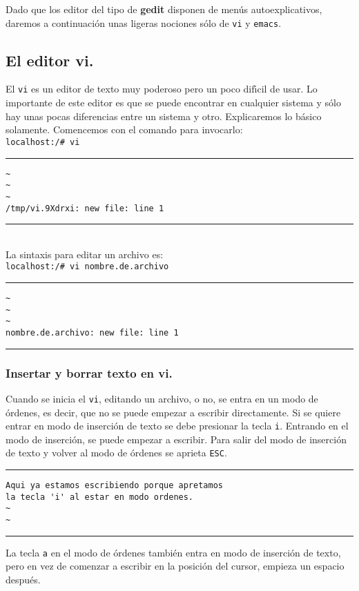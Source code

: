 Dado que los editor del tipo de {\bf gedit} disponen de men{\'u}s
autoexplicativos, daremos a continuaci{\'o}n unas ligeras nociones s{\'o}lo de
\verb+vi+ y \verb+emacs+.

\subsection{El editor vi.}


El \verb+vi+ es un editor de texto muy poderoso pero un poco dif{\'\i}cil
de usar. Lo importante de este editor es que se puede encontrar en
cualquier sistema {\unix} y s{\'o}lo hay unas pocas diferencias entre un
sistema y otro. Explicaremos lo b{\'a}sico solamente. Comencemos con el
comando para invocarlo:\\
\verb+localhost:/# vi+\\
\rule{12.4cm}{0.1mm}
\begin{verbatim}
~
~
~
/tmp/vi.9Xdrxi: new file: line 1 
\end{verbatim}
\rule{12.4cm}{0.1mm}\\
La sintaxis para editar un archivo es:\\ 
\verb+localhost:/# vi nombre.de.archivo+\\
\rule{12.4cm}{0.1mm}
\begin{verbatim}
~
~
~
nombre.de.archivo: new file: line 1
\end{verbatim}
\rule{12.4cm}{0.1mm}

\subsubsection{Insertar y borrar texto en vi.}

Cuando se inicia el \verb+vi+, editando un archivo, o no, se entra en
un modo de \'ordenes, es decir, que no se puede empezar a escribir
directamente.  Si se quiere entrar en modo de inserci{\'o}n de texto se
debe presionar la tecla \verb+i+. Entrando en el modo de inserci{\'o}n, se
puede empezar a escribir. Para salir del modo de inserci{\'o}n de texto y
volver al modo de \'ordenes se aprieta \verb+ESC+.

\newpage 
\noindent
\rule{12.4cm}{0.1mm}
\begin{verbatim}
Aqui ya estamos escribiendo porque apretamos 
la tecla 'i' al estar en modo ordenes.
~
~
\end{verbatim}
\rule{12.4cm}{0.1mm}

\vspace{.3cm}

La tecla \verb+a+ en el modo de \'ordenes tambi{\'e}n entra en modo de
inserci{\'o}n de texto, pero en vez de comenzar a escribir en la posici{\'o}n
del cursor, empieza un espacio despu{\'e}s.

